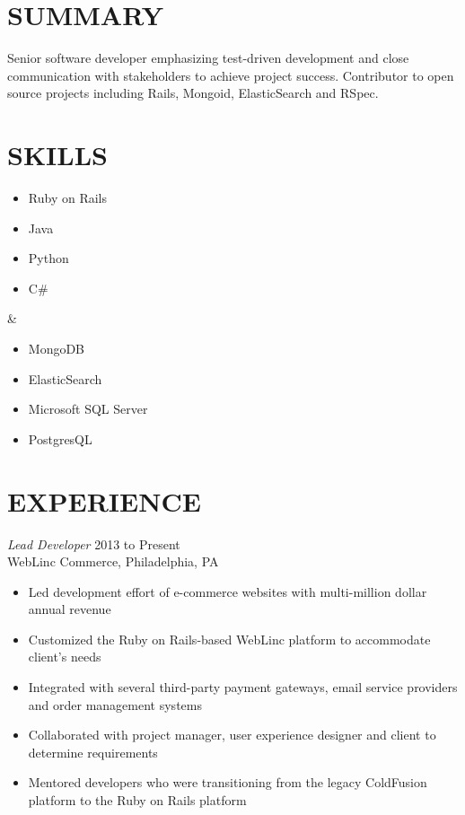 \documentclass[line]{res}
\begin{document}
\newsectionwidth{0in}

\address{26 Park Ave, Apt E67, Chalfont, PA 18914}
\address{(267) 247-2541 / michaelcdalton@gmail.com / github.com/kcdragon}

\begin{resume}

\section{SUMMARY}
Senior software developer emphasizing test-driven development and close communication with stakeholders to achieve project success. Contributor to open source projects including Rails, Mongoid, ElasticSearch and RSpec.

\section{SKILLS}
\begin{ncolumn}{2}
\begin{itemize} \itemsep -2pt
\item Ruby on Rails
\item Java
\item Python
\item C\#
\end{itemize}
&
\begin{itemize} \itemsep -2pt
\item MongoDB
\item ElasticSearch
\item Microsoft SQL Server
\item PostgresQL
\end{itemize}
\end{ncolumn}

\section{EXPERIENCE}

{\sl Lead Developer} \hfill 2013 to Present \\
WebLinc Commerce, Philadelphia, PA
\begin{itemize} \itemsep -2pt
\item Led development effort of e-commerce websites with multi-million dollar annual revenue
\item Customized the Ruby on Rails-based WebLinc platform to accommodate client's needs
\item Integrated with several third-party payment gateways, email service providers and order management systems
\item Collaborated with project manager, user experience designer and client to determine requirements
\item Mentored developers who were transitioning from the legacy ColdFusion platform to the Ruby on Rails platform
\end{itemize}


\end{resume}
\end{document}
